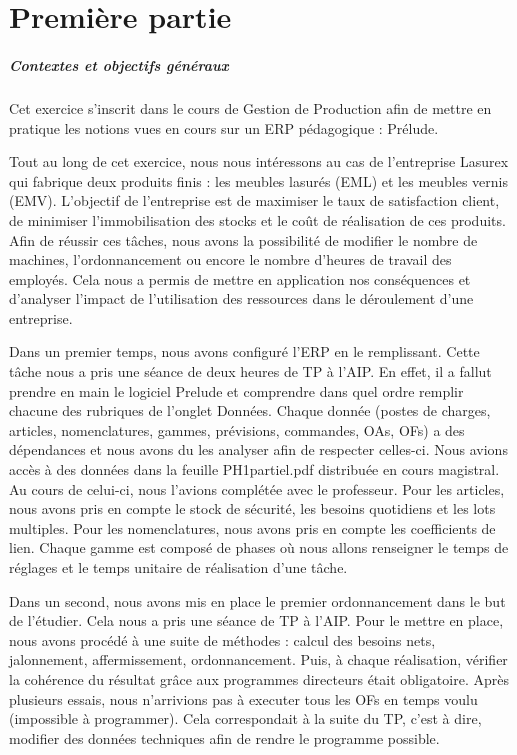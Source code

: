 \documentclass{scrreprt}
\begin{document}
\tableofcontents

\chapter{Première partie}

\paragraph{Contextes et objectifs généraux}
Cet exercice s'inscrit dans le cours de Gestion de Production afin de mettre en pratique les notions
vues en cours sur un ERP pédagogique :  Prélude. 

Tout au long de cet exercice, nous nous intéressons au cas de l'entreprise Lasurex qui fabrique deux
produits finis : les meubles lasurés (EML) et les meubles vernis (EMV). L'objectif de l'entreprise est 
de maximiser le taux de satisfaction client, de minimiser l'immobilisation des stocks et
le coût de réalisation de ces produits. Afin de réussir ces tâches, nous avons la possibilité de modifier le nombre de machines, l'ordonnancement ou encore le nombre d'heures de travail des employés. Cela nous a permis de mettre en application nos conséquences et d'analyser l'impact de l'utilisation des ressources dans le déroulement d'une entreprise.

Dans un premier temps, nous avons configuré l'ERP en le remplissant. Cette tâche nous a pris une séance de deux heures de TP à l'AIP. En effet, il a fallut prendre en main le logiciel Prelude et comprendre dans quel ordre remplir chacune des rubriques de l'onglet Données. Chaque donnée (postes de charges, articles, nomenclatures, gammes, prévisions, commandes, OAs, OFs) a des dépendances et nous avons du les analyser afin de respecter celles-ci. Nous avions accès à des données dans la feuille PH1partiel.pdf distribuée en cours magistral. Au cours de celui-ci, nous l'avions complétée avec le professeur. Pour les articles, nous avons pris en compte le stock de sécurité, les besoins quotidiens et les lots multiples. Pour les nomenclatures, nous avons pris en compte les coefficients de lien. Chaque gamme est composé de phases où nous allons renseigner le temps de réglages et le temps unitaire de réalisation d'une tâche.

Dans un second, nous avons mis en place le premier ordonnancement dans le but de l'étudier. Cela nous a pris une séance de TP à l'AIP. Pour le mettre en place, nous avons procédé à une suite de méthodes : calcul des besoins nets, jalonnement, affermissement, ordonnancement. Puis, à chaque réalisation, vérifier la cohérence du résultat grâce aux programmes directeurs était obligatoire. Après plusieurs essais, nous n'arrivions pas à executer tous les OFs en temps voulu (impossible à programmer). Cela correspondait à la suite du TP, c'est à dire, modifier des données techniques afin de rendre le programme possible.
\end{document}

